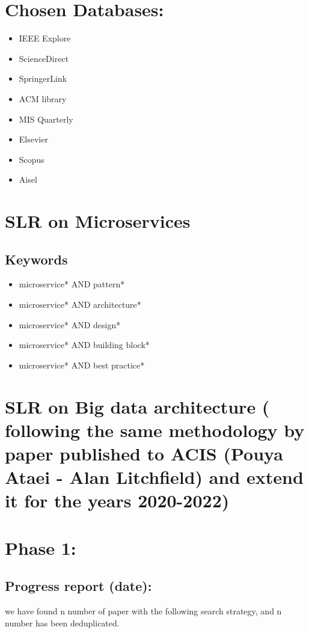 \documentclass{article}
\theoremstyle{mytheoremstyle}
\theoremstyle{mytheoremstyle}
\theoremstyle{myproblemstyle}
\begin{document}
    \section{Chosen Databases:}
    \begin{itemize}
        \item IEEE Explore
        \item ScienceDirect
        \item SpringerLink
        \item ACM library
        \item MIS Quarterly
        \item Elsevier
        \item Scopus
        \item Aisel
    \end{itemize}

    \section{SLR on Microservices }
    \subsection{Keywords}
    \begin{itemize}
        \item microservice* AND pattern* 
        \item microservice* AND architecture*
        \item microservice* AND design*
        \item microservice* AND building block*
        \item microservice* AND best practice*
    \end{itemize}

    \section{ SLR on Big data architecture ( following the same methodology by paper published to ACIS (Pouya Ataei - Alan Litchfield) and extend it for the years 2020-2022) }


    \section{Phase 1:}
    \subsection{Progress report (date): }

     we have found n number of paper with the following search strategy, and n number has been deduplicated. 
\end{document}
